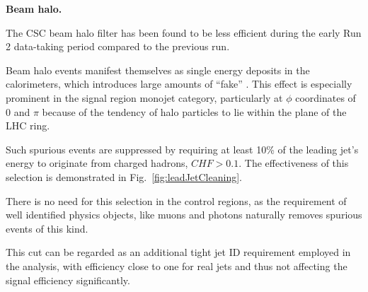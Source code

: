

{\bf Beam halo.}

The CSC beam halo filter has been found to be less efficient during the early
Run 2 data-taking period compared to the previous run.

Beam halo events manifest themselves as single energy deposits in the
calorimeters, which introduces large amounts of ``fake'' \met. This effect is
especially prominent in the signal region monojet category, particularly at
$\phi$ coordinates of 0 and $\pi$ because of the tendency of halo particles to
lie within the plane of the LHC ring. 

Such spurious events are suppressed by requiring at least 10\% of the leading
jet's energy to originate from charged hadrons, $CHF>0.1$. The effectiveness of this selection
is demonstrated in Fig.~\ref{fig:leadJetCleaning}.

There is no need for this selection in the control regions, 
as the requirement of well identified physics objects, like muons 
and photons naturally removes spurious events of this kind. 

This cut can be regarded as 
an additional tight jet ID requirement employed in the analysis, 
with efficiency close to one for real jets and thus not affecting the 
signal efficiency significantly. 


